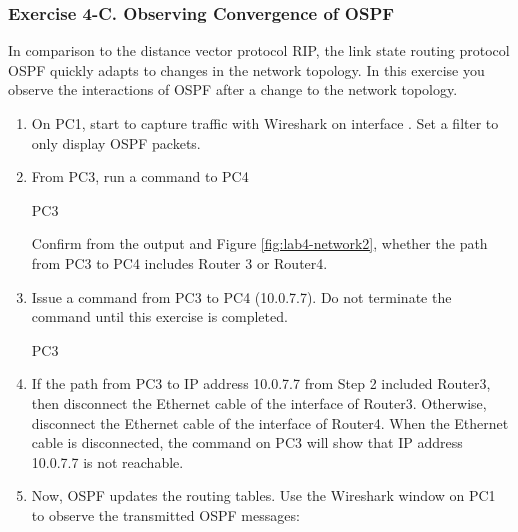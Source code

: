 \subsubsection*{Exercise 4-C. Observing Convergence of OSPF}

In comparison to the distance vector protocol RIP, the link state routing protocol OSPF quickly adapts to changes in the network topology. In this exercise you observe the interactions of OSPF after a change to the network topology.
\begin{enumerate}
	\item On PC1, start to capture traffic with Wireshark on interface . Set a filter to only display OSPF packets.
	\item From PC3, run a  command to PC4 
		\begin{cmdblock}
	PC3%
		\end{cmdblock}
		Confirm from the output and Figure \ref{fig:lab4-network2}, whether the path from PC3 to PC4 includes Router 3 or Router4.
	\item Issue a  command from PC3 to PC4 (10.0.7.7). Do not terminate the  command until this exercise is completed.
		\begin{cmdblock}
	PC3%
		\end{cmdblock}
	\item If the path from PC3 to IP address 10.0.7.7 from Step 2 included Router3, then disconnect the Ethernet cable of the  interface of Router3. Otherwise, disconnect the Ethernet cable of the  interface of Router4.
When the Ethernet cable is disconnected, the  command on PC3 will show that IP address 10.0.7.7 is not reachable.
	\item Now, OSPF updates the routing tables. Use the Wireshark window on PC1 to observe the transmitted OSPF messages:
\end{enumerate}

\begin{questions}
\end{questions}

